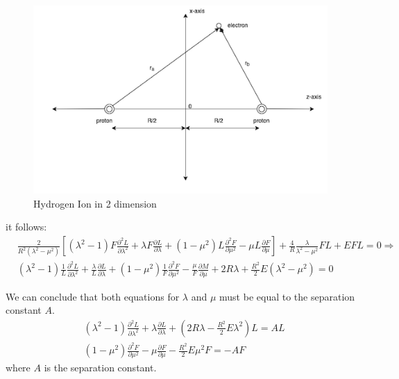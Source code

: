 \begin{figure}
 \captionsetup{type=figure}
  \includegraphics{H2Ion3D-2.png}
  \caption{Hydrogen Ion in 2 dimension} 
  \label{h2ion2d}
\end{figure}
it follows:
\begin{equation}
\begin{split}
& \frac{2}{ R^2 (\lambda^2-\mu^2) }\left[(\lambda^2-1)F\frac{\partial^2 L}{\partial \lambda^2} + \lambda F\frac{\partial L}{\partial \lambda} +
(1 - \mu^2)L\frac{\partial^2 F}{\partial \mu^2} - \mu L\frac{\partial F}{\partial \mu} \right] + \frac{4}{R}\frac{\lambda}{\lambda^2-\mu^2} F L + E F L = 0 \Rightarrow \\[.8em]
& (\lambda^2-1)\frac{1}{L}\frac{\partial^2 L}{\partial \lambda^2} + \frac{\lambda}{L}\frac{\partial L}{\partial \lambda} +
(1 - \mu^2)\frac{1}{F}\frac{\partial^2 F}{\partial \mu^2} - \frac{\mu}{F} \frac{\partial M}{\partial \mu} + 2R\lambda + \frac{R^2}{2} E (\lambda^2 - \mu^2) = 0
\end{split}
\end{equation}

We can conclude that both equations for $ \lambda $ and $ \mu $ must be equal to the separation constant $ A $. 
\begin{equation}\label{eqLG3}
\begin{split}
& (\lambda^2-1)\frac{\partial^2 L}{\partial \lambda^2} + \lambda\frac{\partial L}{\partial \lambda} + \left(2R\lambda -  \frac{R^2}{2} E\lambda^2\right) L = AL \\[.8em]
& (1 - \mu^2)\frac{\partial^2 F}{\partial \mu^2} - \mu\frac{\partial F}{\partial \mu} - \frac{R^2}{2} E \mu^2 F = -AF
\end{split}
\end{equation}
where $ A $ is the separation constant.

